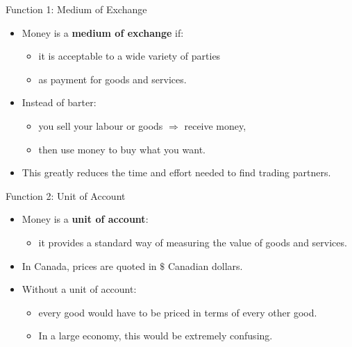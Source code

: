 \documentclass[aspectratio=169]{beamer}
\begin{document}
\begin{frame}{Function 1: Medium of Exchange}
\transfade
\begin{itemize}
  \item Money is a \textbf{medium of exchange} if:
  \begin{itemize}
    \item it is acceptable to a wide variety of parties
    \item as payment for goods and services.
  \end{itemize}
  \item Instead of barter:
  \begin{itemize}
    \item you sell your labour or goods \(\Rightarrow\) receive money,
    \item then use money to buy what you want.
  \end{itemize}
  \item This greatly reduces the time and effort needed to find trading partners.
\end{itemize}
\end{frame}

\begin{frame}{Function 2: Unit of Account}
\transfade
\begin{itemize}
  \item Money is a \textbf{unit of account}:
  \begin{itemize}
    \item it provides a standard way of measuring the value of goods and services.
  \end{itemize}
  \item In Canada, prices are quoted in \(\$\) \alert{Canadian dollars}.
  \item Without a unit of account:
  \begin{itemize}
    \item every good would have to be priced in terms of every other good.
    \item In a large economy, this would be extremely confusing.
  \end{itemize}
\end{itemize}
\end{frame}
\end{document}
